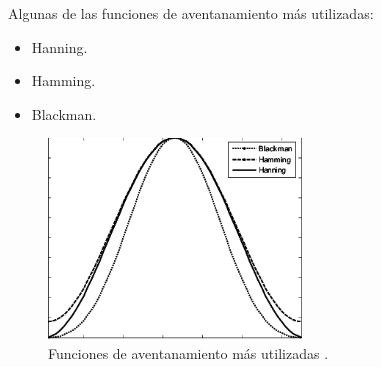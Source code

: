 Algunas de las funciones de aventanamiento más utilizadas:
\begin{itemize}
    \item Hanning.
    \item Hamming.
    \item Blackman.
\end{itemize}

\begin{figure}[H]
    \centering
    \includegraphics[width=0.6\textwidth]{imagenes/cap1_marcoteo/windows.png}
    \caption{Funciones de aventanamiento más utilizadas \citep{windowing2006}.}
    \label{fig:ventanas}
\end{figure}